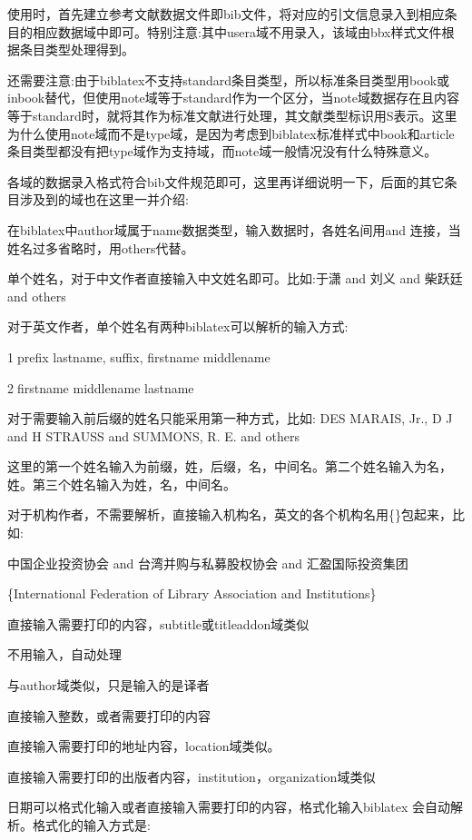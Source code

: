 \documentclass[11pt]{article} %
\begin{document}
使用时，首先建立参考文献数据文件即bib文件，将对应的引文信息录入到相应条目的相应数据域中即可。特别注意:其中usera域不用录入，该域由bbx样式文件根据条目类型处理得到。

还需要注意:由于biblatex不支持standard条目类型，所以标准条目类型用book或inbook替代，但使用note域等于standard作为一个区分，当note域数据存在且内容等于standard时，就将其作为标准文献进行处理，其文献类型标识用S表示。这里为什么使用note域而不是type域，是因为考虑到biblatex标准样式中book和article条目类型都没有把type域作为支持域，而note域一般情况没有什么特殊意义。

各域的数据录入格式符合bib文件规范即可，这里再详细说明一下，后面的其它条目涉及到的域也在这里一并介绍:
\begin{description}[topsep=5pt,partopsep=0pt,parsep=0pt,%
itemsep=0pt,leftmargin=2.2cm,rightmargin=0.5cm,labelwidth=2cm]
  \item[author] 在biblatex中author域属于name数据类型，输入数据时，各姓名间用and 连接，当姓名过多省略时，用others代替。

      单个姓名，对于中文作者直接输入中文姓名即可。比如:于潇 and 刘义 and 柴跃廷 and others

      对于英文作者，单个姓名有两种biblatex可以解析的输入方式:

      \textcircled{1}prefix lastname, suffix, firstname middlename

      \textcircled{2}firstname middlename lastname

      对于需要输入前后缀的姓名只能采用第一种方式，比如:
      DES MARAIS, Jr., D J and H STRAUSS and SUMMONS, R. E. and others

      这里的第一个姓名输入为前缀，姓，后缀，名，中间名。第二个姓名输入为名，姓。第三个姓名输入为姓，名，中间名。

      对于机构作者，不需要解析，直接输入机构名，英文的各个机构名用\{\}包起来，比如:

      中国企业投资协会 and 台湾并购与私募股权协会 and 汇盈国际投资集团

      \{International Federation of Library Association and Institutions\}

  \item[title] 直接输入需要打印的内容，subtitle或titleaddon域类似
  \item[usera] 不用输入，自动处理
  \item[translator] 与author域类似，只是输入的是译者
  \item[edition] 直接输入整数，或者需要打印的内容
  \item[address] 直接输入需要打印的地址内容，location域类似。
  \item[publisher] 直接输入需要打印的出版者内容，institution，organization域类似
  \item[date] 日期可以格式化输入或者直接输入需要打印的内容，格式化输入biblatex 会自动解析。格式化的输入方式是:


\end{description}
\end{document}
